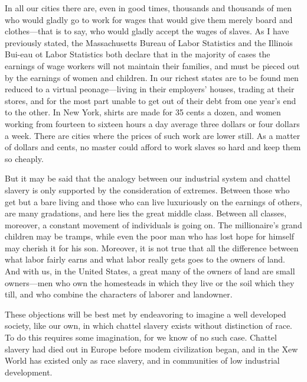 \documentclass{book}
\begin{document}
In all our cities there are, even in good times, thousands and thousands of men who would gladly go to work for wages that would give them merely board and clothes—that is to say, who would gladly accept the wages of slaves. As I have previously stated, the Massachusetts Bureau of Labor Statistics and the Illinois Bui-eau ot Labor Statistics both declare that in the majority of cases the earnings of wage workers will not maintain their families, and must be pieced out by the earnings of women and children. In our richest states are to be found men reduced to a virtual peonage—living in their employers’ houses, trading at their stores, and for the most part unable to get out of their debt from one year’s end to the other. In New York, shirts are made for 35 cents a dozen, and women working from fourteen to sixteen hours a day average three dollars or four dollars a week. There are cities where the prices of such work are lower still. As a matter of dollars and cents, no master could afford to work slaves so hard and keep them so cheaply.

But it may be said that the analogy between our industrial system and chattel slavery is only supported by the consideration of extremes. Between those who get but a bare living and those who can live luxuriously on the earnings of others, are many gradations, and here lies the great middle class. Between all classes, moreover, a constant movement of individuals is going on. The millionaire’s grand children may be tramps, while even the poor man who has lost hope for himself may cherish it for his son. Moreover, it is not true that all the difference between what labor fairly earns and what labor really gets goes to the owners of land. And with us, in the United States, a great many of the owners of land are small owners—men who own the homesteads in which they live or the soil which they till, and who combine the characters of laborer and landowner.

These objections will be best met by endeavoring to imagine a well developed society, like our own, in which chattel slavery exists without distinction of race. To do this requires some imagination, for we know of no such case. Chattel slavery had died out in Europe before modem civilization began, and in the Xew World has existed only as race slavery, and in communities of low industrial development.
\end{document}
